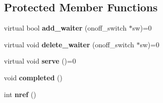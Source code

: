 \subsection*{Protected Member Functions}
\begin{CompactItemize}
\item 
\hypertarget{group__iolayer_g2f72232aa958b26b36b04c2ade02b1d6}{
virtual bool \textbf{add\_\-waiter} (onoff\_\-switch $\ast$sw)=0}
\label{group__iolayer_g2f72232aa958b26b36b04c2ade02b1d6}

\item 
\hypertarget{group__iolayer_g30252a01456b49135c054dde2b8e8c6d}{
virtual void \textbf{delete\_\-waiter} (onoff\_\-switch $\ast$sw)=0}
\label{group__iolayer_g30252a01456b49135c054dde2b8e8c6d}

\item 
\hypertarget{group__iolayer_g47a70e642437bd2a3cdcb2f64e269fcb}{
virtual void \textbf{serve} ()=0}
\label{group__iolayer_g47a70e642437bd2a3cdcb2f64e269fcb}

\item 
\hypertarget{group__iolayer_gdae52da05a69bea331d1161156159b06}{
void \textbf{completed} ()}
\label{group__iolayer_gdae52da05a69bea331d1161156159b06}

\item 
\hypertarget{group__iolayer_g11bad6558be8c299ed7c14f0ed9e62d2}{
int \textbf{nref} ()}
\label{group__iolayer_g11bad6558be8c299ed7c14f0ed9e62d2}

\end{CompactItemize}
